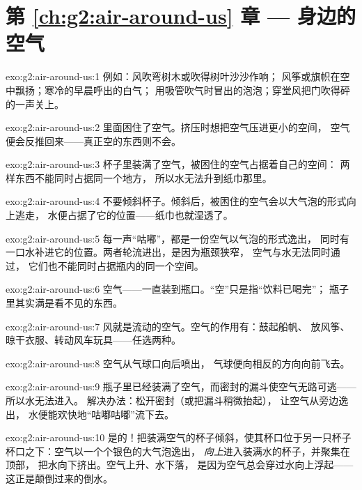 \section*{第 \ref{ch:g2:air-around-us} 章 --- 身边的空气}

\begin{solution}{exo:g2:air-around-us:1}
例如：风吹弯树木或吹得树叶沙沙作响；
风筝或旗帜在空中飘扬；寒冷的早晨呼出的白气；
用吸管吹气时冒出的泡泡；穿堂风把门吹得砰的一声关上。
\end{solution}

\begin{solution}{exo:g2:air-around-us:2}
里面困住了空气。挤压时想把空气压进更小的空间，
空气便会反推回来——真正空的东西则不会。
\end{solution}

\begin{solution}{exo:g2:air-around-us:3}
杯子里装满了空气，被困住的空气占据着自己的空间：
两样东西不能同时占据同一个地方，
所以水无法升到纸巾那里。
\end{solution}

\begin{solution}{exo:g2:air-around-us:4}
不要倾斜杯子。倾斜后，被困住的空气会以大气泡的形式向上逃走，
水便占据了它的位置——纸巾也就湿透了。
\end{solution}

\begin{solution}{exo:g2:air-around-us:5}
每一声“咕嘟”，都是一份空气以气泡的形式逸出，
同时有一口水补进它的位置。两者轮流进出，是因为瓶颈狭窄，
空气与水无法同时通过，
它们也不能同时占据瓶内的同一个空间。
\end{solution}

\begin{solution}{exo:g2:air-around-us:6}
空气——一直装到瓶口。“空”只是指“饮料已喝完”；
瓶子里其实满是看不见的东西。
\end{solution}

\begin{solution}{exo:g2:air-around-us:7}
风就是流动的空气。空气的作用有：鼓起船帆、
放风筝、晾干衣服、转动风车玩具——任选两种。
\end{solution}

\begin{solution}{exo:g2:air-around-us:8}
空气从气球口向后喷出，
气球便向相反的方向向前飞去。
\end{solution}

\begin{solution}{exo:g2:air-around-us:9}
瓶子里已经装满了空气，而密封的漏斗使空气无路可逃——所以水无法进入。
解决办法：松开密封（或把漏斗稍微抬起），
让空气从旁边逸出，
水便能欢快地“咕嘟咕嘟”流下去。
\end{solution}

\begin{solution}{exo:g2:air-around-us:10}
是的！把装满空气的杯子倾斜，使其杯口位于另一只杯子杯口之下：空气以一个个银色的大气泡逸出，
\emph{向上}进入装满水的杯子，并聚集在顶部，
把水向下挤出。空气上升、水下落，
是因为空气总会穿过水向上浮起——
这正是颠倒过来的倒水。
\end{solution}
